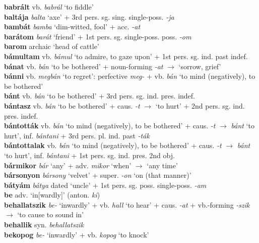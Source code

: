 \documentclass[11pt]{article}
\begin{document}
\textbf{babrált} vb. \emph{babrál} `to fiddle' \\
\textbf{baltája} \emph{balta} `axe' + 3rd
pers. sg. sing. single\hyp{}poss. \emph{-ja} \\
\textbf{bambát} \emph{bamba} `dim\hyp{}witted, fool' +
acc. \emph{-at} \\
\textbf{barátom} \emph{barát} `friend' + 1st
pers. sg. single\hyp{}poss. poss. \emph{-om} \\
\textbf{barom} archaic `head of cattle'  \\
\textbf{bámultam} vb. \emph{bámul} `to admire, to gaze upon' + 1st
pers. sg. ind. past indef. \\
\textbf{bánat} vb. \emph{bán} `to be bothered' +
noun\hyp{}forming \emph{-at} $\rightarrow$ `sorrow, grief' \\
\textbf{bánni} vb. \emph{megbán} `to regret':
perfective \emph{meg-} + vb. \emph{bán} `to mind (negatively),
to be bothered' \\
\textbf{bánt} vb. \emph{bán} `to be bothered' + 3rd
pers. sg. ind. pres. indef. \\
\textbf{bántasz} vb. \emph{bán} `to be bothered' + caus. \emph{-t}
$\rightarrow$ `to hurt' + 2nd pers. sg. ind. pres. indef. \\
\textbf{bántották} vb. \emph{bán} `to mind (negatively),
to be bothered' + caus. \emph{-t} $\rightarrow$ \emph{bánt} `to hurt',
inf. \emph{bántani} + 3rd pers. pl. ind. past \emph{-ták} \\
\textbf{bántottalak} vb. \emph{bán} `to mind (negatively),
to be bothered' + caus. \emph{-t} $\rightarrow$ \emph{bánt} `to hurt',
inf. \emph{bántani} + 1st pers. sg. ind. pres. 2nd obj. \\
\textbf{bármikor} \emph{bár} `any' + adv. \emph{mikor} `when'
  $\rightarrow$ `any time' \\
\textbf{bársonyon} \emph{bársony} `velvet' + super. \emph{-on}
`on (that manner)' \\
\textbf{bátyám} \emph{bátya} dated `uncle' + 1st
pers. sg. poss. single\hyp{}poss. \emph{-am} \\
\textbf{be} adv. `in[wardly]' (anton. \emph{ki}) \\
\textbf{behallatszik} \emph{be-} `inwardly' +
vb. \emph{hall} `to hear' + caus. \emph{-at} +
vb.-forming \emph{-szik} $\rightarrow$ `to cause to sound in' \\
\textbf{behallik} syn. \emph{behallatszik} \\
\textbf{bekopog} \emph{be-} `inwardly' + vb. \emph{kopog}
`to knock' \\
\end{document}

